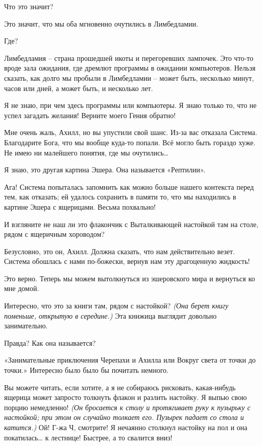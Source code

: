 \documentclass[../main.tex]{subfiles}
\begin{document}
\begin{Dialogue}
\begin{sublevel}
\begin{sublevel}
 Что это значит?

 Это значит, что мы оба мгновенно очутились в Лимбедламии.

 Где?

 Лимбедламия \--- страна прошедшей икоты и перегоревших лампочек. Это что-то вроде зала ожидания, где дремлют программы в ожидании компьютеров. Нельзя сказать, как долго мы пробыли в Лимбедламии \--- может быть, несколько минут, часов или дней, а может быть, и несколько лет.

 Я не знаю, при чем здесь программы или компьютеры. Я знаю только то, что не успел загадать желания! Верните моего Гения обратно!

 Мне очень жаль, Ахилл, но вы упустили свой шанс. Из-за вас отказала Система. Благодарите Бога, что мы вообще куда-то попали. Всё могло быть гораздо хуже. Не имею ни малейшего понятия, где мы очутились\ldots{}

 Я знаю, это другая картина Эшера. Она называется «Рептилии».

 Ага! Система попыталась запомнить как можно больше нашего контекста перед тем, как отказать; ей удалось сохранить в памяти то, что мы находились в картине Эшера с ящерицами. Весьма похвально!


 И взгляните не наш ли это флакончик с Выталкивающей настойкой там на столе, рядом с ящеричным хороводом?

 Безусловно, это он, Ахилл. Должна сказать, что нам действительно везет. Система обошлась с нами по-божески, вернув нам эту драгоценную жидкость!

 Это верно. Теперь мы можем вытолкнуться из эшеровского мира и вернуться ко мне домой.

 Интересно, что это за книги там, рядом с настойкой? \emph{(Она берет книгу поменьше, открытую в середине.)} Эта книжица выглядит довольно занимательно.

 Правда? Как она называется?

 «Занимательные приключения Черепахи и Ахилла или Вокруг света от точки до точки.» Интересно было было бы почитать немного.

 Вы можете читать, если хотите, а я не собираюсь рисковать, какая-нибудь ящерица может запросто толкнуть флакон и разлить настойку. Я выпью свою порцию немедленно! \emph{(Он бросается к столу и протягивает руку к пузырьку с настойкой; при этом он случайно толкает его. Пузырек падает со стола и катится.)} Ой! Г-жа Ч, смотрите! Я нечаянно столкнул настойку на пол и она покатилась\ldots{} к лестнице! Быстрее, а то свалится вниз!


\end{sublevel}
\end{sublevel}
\end{Dialogue}
\end{document}
